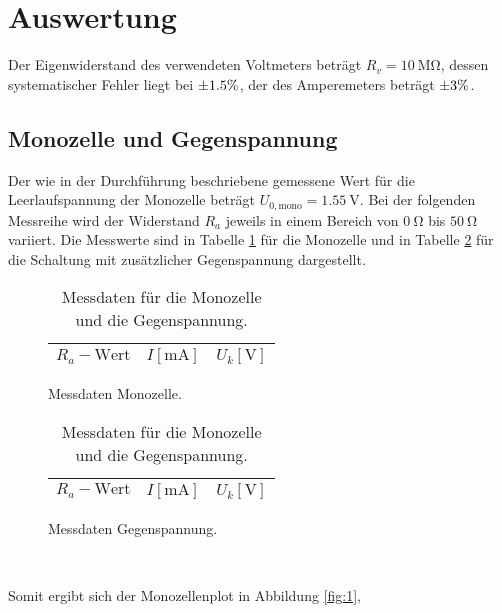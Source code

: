 \section{Auswertung}
\label{sec:Auswertung}
Der Eigenwiderstand des verwendeten Voltmeters beträgt $R_v=\SI{10}{\mega\ohm}$, dessen systematischer Fehler liegt bei $\num{+-1.5}\%$, der des Amperemeters beträgt $\num{+-3}\%$.
\subsection{Monozelle und Gegenspannung}
\label{ch:auswertung}
Der wie in der Durchführung beschriebene gemessene Wert für die Leerlaufspannung der Monozelle beträgt $U_{0,\text{mono}} = \SI{1.55}{\volt}$.
Bei der folgenden Messreihe wird der Widerstand $R_a$ jeweils in einem Bereich von $\SI{0}{\ohm}$ bis $\SI{50}{\ohm}$ variiert.
Die Messwerte sind in Tabelle \ref{tab:1} für die Monozelle und in Tabelle \ref{tab:2} für die Schaltung mit zusätzlicher Gegenspannung dargestellt.
\begin{table}
  \hspace*{\fill}
  \begin{subfigure}{0.40\textwidth}
  \centering
  \caption{Messdaten Monozelle.}
  \label{tab:1}
  \begin{tabular}{c c c}
    \toprule
    {$R_a-\text{Wert}$} & {$I [\si{\milli\ampere}]$} & {$U_k [\si{\volt}]$} \\
    \midrule
    
    \bottomrule
  \end{tabular}
\end{subfigure}
\hspace*{\fill}
\begin{subfigure}{0.40\textwidth}
  \centering
  \caption{Messdaten Gegenspannung.}
  \label{tab:2}
  \begin{tabular}{c c c}
    \toprule
    {$R_a-\text{Wert}$} & {$I [\si{\milli\ampere}]$} & {$U_k [\si{\volt}]$} \\
    \midrule
    
    \bottomrule
  \end{tabular}
\end{subfigure}
\\
\hspace*{\fill}
\hspace*{\fill}
\caption{Messdaten für die Monozelle und die Gegenspannung.}
\end{table}

Somit ergibt sich der Monozellenplot in Abbildung \ref{fig:1},

